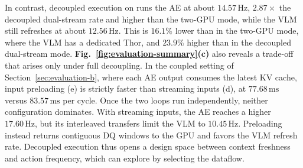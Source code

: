 In contrast, decoupled execution on \sys{} runs the AE at about $14.57\,\mathrm{Hz}$, $2.87\times$ the decoupled dual-stream rate and higher than the two-GPU mode, while the VLM still refreshes at about $12.56\,\mathrm{Hz}$. This is $16.1\%$ lower than in the two-GPU mode, where the VLM has a dedicated Thor, and $23.9\%$ higher than in the decoupled dual-stream mode. \textbf{Fig.~\ref{fig:evaluation-summary}(c)} also reveals a trade-off that arises only under full decoupling. In the coupled setting of Section~\ref{sec:evaluation-b}, where each AE output consumes the latest KV cache, input preloading (e) is strictly faster than streaming inputs (d), at $77.68\,\mathrm{ms}$ versus $83.57\,\mathrm{ms}$ per cycle. Once the two loops run independently, neither configuration dominates. With streaming inputs, the AE reaches a higher $17.60\,\mathrm{Hz}$, but its interleaved transfers limit the VLM to $10.45\,\mathrm{Hz}$. Preloading instead returns contiguous DQ windows to the GPU and favors the VLM refresh rate. Decoupled execution thus opens a design space between context freshness and action frequency, which \sys{} can explore by selecting the dataflow.